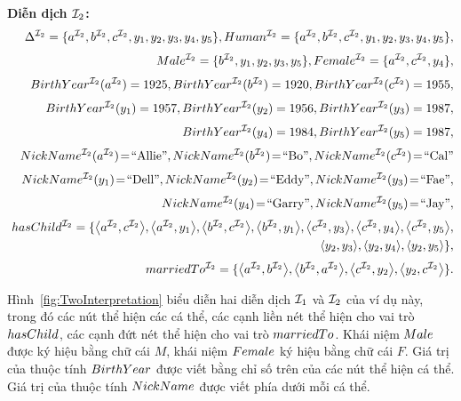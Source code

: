 \begin{Example}
	\noindent
	\textbf{Diễn dịch $\mathcal{I}_2$:}
	\allowdisplaybreaks
	\begin{eqnarray*}
		& &\!\!\!\! \Delta^{\mI_2} = \{a^{\mI_2}, b^{\mI_2}, c^{\mI_2}, y_1, y_2, y_3, y_4, y_5\},
		\Human^{\mI_2} = \{a^{\mI_2}, b^{\mI_2}, c^{\mI_2}, y_1, y_2, y_3, y_4, y_5\},\\[0.7ex]
		& &\!\!\!\! \Male^{\mI_2} = \{b^{\mI_2}, y_1, y_2, y_3, y_5\},
		\Female^{\mI_2} = \{a^{\mI_2}, c^{\mI_2}, y_4\},\\[0.7ex]
		& &\!\!\!\! \BirthYear^{\mI_2}(a^{\mI_2}) = 1925,
		\BirthYear^{\mI_2}(b^{\mI_2}) = 1920,
		\BirthYear^{\mI_2}(c^{\mI_2}) = 1955,\\[0.7ex]
		& &\!\!\!\! \BirthYear^{\mI_2}(y_1) = 1957,
		\BirthYear^{\mI_2}(y_2) = 1956,
		\BirthYear^{\mI_2}(y_3) = 1987,\\[0.7ex]
		& &\!\!\!\! \BirthYear^{\mI_2}(y_4) = 1984,
		\BirthYear^{\mI_2}(y_5) = 1987,\\[0.7ex]
		& &\!\!\!\! \NickName^{\mI_2}(a^{\mI_2})\! =\! \text{``Allie''},
		\NickName^{\mI_2}(b^{\mI_2})\! =\! \text{``Bo''},
		\NickName^{\mI_2}(c^{\mI_2})\! =\! \text{``Cal''}\\[0.7ex]
		& &\!\!\!\! \NickName^{\mI_2}(y_1)\! =\! \text{``Dell''},
		\NickName^{\mI_2}(y_2)\! =\! \text{``Eddy''},
		\NickName^{\mI_2}(y_3)\! =\! \text{``Fae''},\\[0.7ex]
		& &\!\!\!\! \NickName^{\mI_2}(y_4)\! =\! \text{``Garry''},
		\NickName^{\mI_2}(y_5)\! =\! \text{``Jay''},\\[0.7ex]
		& &\!\!\!\! \hasChild^{\mI_2} = \{\tuple{a^{\mI_2}, c^{\mI_2}}, \tuple{a^{\mI_2}, y_1}, \tuple{b^{\mI_2}, c^{\mI_2}}, \tuple{b^{\mI_2}, y_1}, \tuple{c^{\mI_2}, y_3},\tuple{c^{\mI_2}, y_4},\tuple{c^{\mI_2}, y_5},\\
		& &\!\!\!\! \qquad\qquad\qquad\;\;\;\tuple{y_2, y_3},\tuple{y_2, y_4},\tuple{y_2, y_5}\,\},\\[0.7ex]
		& &\!\!\!\! \marriedTo^{\mI_2} = \{\tuple{a^{\mI_2},b^{\mI_2}}, \tuple{b^{\mI_2}, a^{\mI_2}}, \tuple{c^{\mI_2},y_2}, \tuple{y_2,c^{\mI_2}}\,\}.
	\end{eqnarray*}

	Hình~\ref{fig:TwoInterpretation} biểu diễn hai diễn dịch $\mathcal{I}_1$ và $\mathcal{I}_2$ của ví dụ này, trong đó các nút thể hiện các cá thể, các cạnh liền nét thể hiện cho vai trò $hasChild$, các cạnh đứt nét thể hiện cho vai trò $marriedTo$. Khái niệm $Male$ được ký hiệu bằng chữ cái $M$, khái niệm $Female$ ký hiệu bằng chữ cái $F$. Giá trị của thuộc tính $BirthYear$ được viết bằng chỉ số trên của các nút thể hiện cá thể. Giá trị của thuộc tính $NickName$ được viết phía dưới mỗi cá thể.
		

\end{Example}
